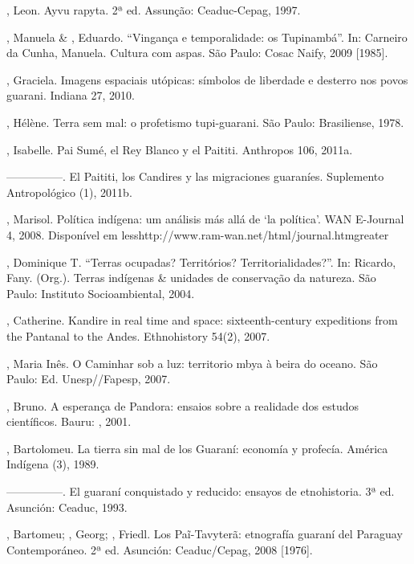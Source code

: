 \begin{Parskip}
, Leon. Ayvu rapyta. 2ª ed. Assunção: Ceaduc-Cepag, 1997.

  , Manuela \&   , Eduardo.
``Vingança e temporalidade: os Tupinambá''. In: Carneiro da Cunha,
Manuela. Cultura com aspas. São Paulo: Cosac Naify, 2009 [1985].

, Graciela. Imagens espaciais utópicas: símbolos de
liberdade e desterro nos povos guarani. Indiana 27, 2010. 

, Hélène. Terra sem mal: o profetismo tupi-guarani. São
Paulo: Brasiliense, 1978.

, Isabelle. Pai Sumé, el Rey Blanco y el Paititi. Anthropos
106, 2011a.

—————. El Paititi, los Candires y las migraciones guaraníes.
Suplemento Antropológico  (1), 2011b.

  , Marisol. Política indígena: um análisis más allá de
‘la política’. WAN E-Journal 4, 2008. Disponível em
{less}http://www.ram-wan.net/html/journal.htm{greater}

, Dominique T. ``Terras ocupadas? Territórios?
Territorialidades?''. In: Ricardo, Fany. (Org.). Terras indígenas \&
unidades de conservação da natureza. São Paulo: Instituto
Socioambiental, 2004.

, Catherine. Kandire in real time and space:
sixteenth-century expeditions from the Pantanal to the Andes.
Ethnohistory 54(2), 2007.

, Maria Inês. O Caminhar sob a luz: territorio mbya à beira
do oceano. São Paulo: Ed. Unesp//Fapesp, 2007.

, Bruno. A esperança de Pandora: ensaios sobre a realidade
dos estudos científicos. Bauru: , 2001.

, Bartolomeu. La tierra sin mal de los Guaraní: economía y
profecía. América Indígena  (3), 1989.

—————. El guaraní conquistado y reducido: ensayos de etnohistoria.
3ª ed. Asunción: Ceaduc, 1993.

, Bartomeu; , Georg; , Friedl. Los
Paĩ{}-Tavyterã: etnografía guaraní del Paraguay Contemporáneo. 2ª
ed. Asunción: Ceaduc/Cepag, 2008 [1976].


\end{Parskip}
